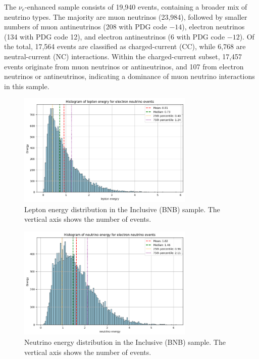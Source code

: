 \documentclass{pracalicmgr}
\begin{document}
The $\nu_e$-enhanced sample consists of 19,940 events, containing a broader mix of neutrino types. The majority are muon neutrinos (23,984), followed by smaller numbers of muon antineutrinos (208 with PDG code $-14$), electron neutrinos (134 with PDG code 12), and electron antineutrinos (6 with PDG code $-12$). Of the total, 17,564 events are classified as charged-current (CC), while 6,768 are neutral-current (NC) interactions. Within the charged-current subset, 17,457 events originate from muon neutrinos or antineutrinos, and 107 from electron neutrinos or antineutrinos, indicating a dominance of muon neutrino interactions in this sample.

\begin{figure}[H]
    \centering
    \includegraphics[width=0.75\textwidth]{src/leptonMuon.png}
    \caption{Lepton energy distribution in the Inclusive (BNB) sample. The vertical axis shows the number of events.}
    \label{fig:lepton-inclusive}
\end{figure}

\begin{figure}[H]
    \centering
    \includegraphics[width=0.75\textwidth]{src/neutrinoMuon.png}
    \caption{Neutrino energy distribution in the Inclusive (BNB) sample. The vertical axis shows the number of events.}
    \label{fig:neutrino-inclusive}
\end{figure}
\end{document}
